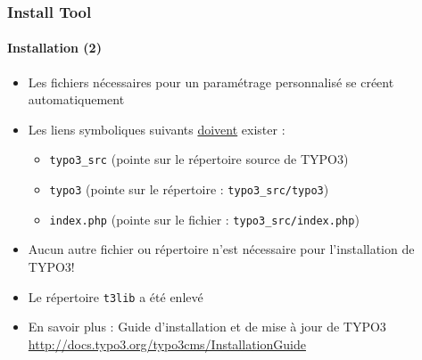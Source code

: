 
\begin{frame}[fragile]

	\frametitle{Install Tool}
	\framesubtitle{Installation (2)}

	\begin{itemize}
		\item Les fichiers nécessaires pour un paramétrage personnalisé se créent automatiquement
		\item Les liens symboliques suivants \underline{doivent} exister :

		\begin{itemize}
			\item \texttt{typo3\_src}	\tabto{2cm} (pointe sur le répertoire source de TYPO3)
			\item \texttt{typo3}		\tabto{2cm} (pointe sur le répertoire : \texttt{typo3\_src/typo3})
			\item \texttt{index.php}	\tabto{2cm} (pointe sur le fichier : \texttt{typo3\_src/index.php})
		\end{itemize}

		\item Aucun autre fichier ou répertoire n'est nécessaire pour l'installation de TYPO3!
		\item Le répertoire \texttt{t3lib} a été enlevé
		\item En savoir plus : Guide d'installation et de mise à jour de TYPO3\newline
			\url{http://docs.typo3.org/typo3cms/InstallationGuide}

	\end{itemize}

\end{frame}


